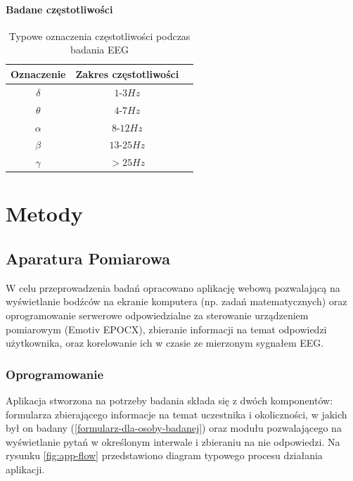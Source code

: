 \documentclass{./assets/wfis}
\begin{document}
\subsubsection{Badane częstotliwości}

\begin{table}[h]
    \centering
    \begin{tabular}{|c|c|c|}
        \hline
        Oznaczenie & Zakres częstotliwości \\
        \hline
        $\delta$ & $1$-$3Hz$  \\
        $\theta$ & $4$-$7Hz$ \\
        $\alpha$ & $8$-$12Hz$ \\
        $\beta$  & $13$-$25Hz$ \\
        $\gamma$ & $>25Hz$ \\
        \hline
    \end{tabular}
    \caption{Typowe oznaczenia częstotliwości podczas badania EEG}
    \label{tab:freqs}
\end{table}
\chapter{Metody}

\section{Aparatura Pomiarowa}\label{aparatura-pomiarowa}

W celu przeprowadzenia badań opracowano aplikację webową pozwalającą na wyświetlanie bodźców na ekranie komputera (np. zadań matematycznych) oraz oprogramowanie serwerowe odpowiedzialne za sterowanie urządzeniem pomiarowym (Emotiv EPOCX), zbieranie informacji na temat odpowiedzi użytkownika, oraz korelowanie ich w czasie ze mierzonym sygnałem EEG.

\subsection{Oprogramowanie}
 
Aplikacja stworzona na potrzeby badania składa się z dwóch komponentów: formularza zbierającego informacje na temat uczestnika i okoliczności, w jakich był on badany (\autoref{formularz-dla-osoby-badanej}) oraz modułu pozwalającego na wyświetlanie pytań w określonym interwale i zbieraniu na nie odpowiedzi. Na rysunku \ref{fig:app-flow} przedstawiono diagram typowego procesu działania aplikacji.
\end{document}
